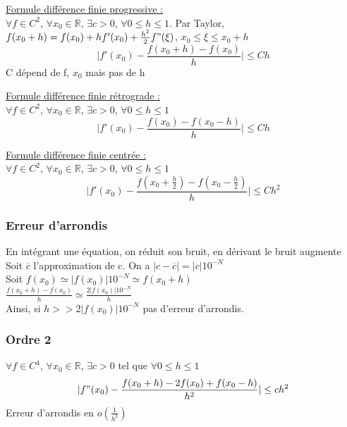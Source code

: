 \documentclass[../main.tex]{subfiles}
\begin{document}
\quad \underline{Formule différence finie progressive :}\\
$\forall f\in C^2$, $\forall x_0\in \mathbb{R}$, $\exists c> 0$, $\forall 0 \leq h \leq 1$. Par Taylor, $f(x_0+h) = f(x_0)+hf'(x_0)+\frac{h^2}{2}f"(\xi)$, $x_0 \leq \xi \leq x_0+h$\\
\begin{equation}
    \lvert f'(x_0) - \frac{f(x_0+h)-f(x_0)}{h}\rvert \leq Ch
\end{equation}
\warning C dépend de f, $x_0$ mais pas de h

\quad \underline{Formule différence finie rétrograde :}\\
$\forall f\in C^2$, $\forall x_0\in \mathbb{R}$, $\exists c> 0$, $\forall 0 \leq h \leq 1$\\
\begin{equation}
    \lvert f'(x_0) - \frac{f(x_0)-f(x_0-h)}{h}\rvert \leq Ch
\end{equation}

\quad \underline{Formule différence finie centrée :}\\
$\forall f\in C^2$, $\forall x_0\in \mathbb{R}$, $\exists c> 0$, $\forall 0 \leq h \leq 1$\\

\begin{equation}
    \lvert f'(x_0) - \frac{f(x_0+\frac{h}{2})-f(x_0-\frac{h}{2})}{h} \rvert \leq Ch^2 
\end{equation}

\subsubsection{Erreur d'arrondis}
En intégrant une équation, on réduit son bruit, en dérivant le bruit augmente\\

Soit $\overline{c}$ l'approximation de c. On a $\lvert c-\overline{c}\rvert = \lvert c \rvert 10^{-N}$\\
Soit $f(x_0) \simeq \lvert f(x_0)\rvert 10^{-N} \simeq f(x_0+h)$\\
$\frac{f(x_0+h)-f(x_0)}{h} \simeq \frac{2 \lvert f(x_0) \rvert 10^{-N}}{h}$\\
Ainsi, si $h>>2\lvert f(x_0)\rvert 10^{-N}$ pas d'erreur d'arrondis. \\

\subsubsection{Ordre 2}
$\forall f\in C^4$, $\forall x_0 \in \mathbb{R}$, $\exists c>0$ tel que $\forall 0\leq h \leq 1$\\
\begin{equation}
    \lvert f"(x_0) - \frac{f(x_0+h) - 2f(x_0) + f(x_0-h)}{h^2} \rvert \leq ch^2
\end{equation}
Erreur d'arrondis en $o(\frac{1}{h^2})$\\
\end{document}
